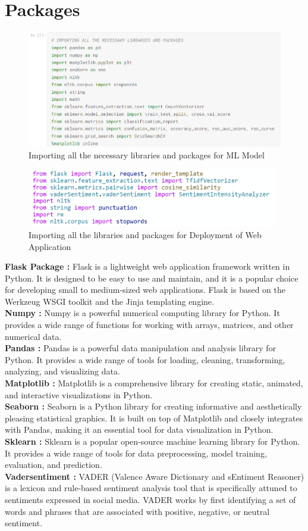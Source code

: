 \documentclass[a4paper, 12pt]{report}
\begin{document}
\section{Packages}
\begin{figure}[h]
	\includegraphics[height=2in,width=6in]{e}
	\caption{Importing all the necessary libraries and packages for ML Model}
	\label{Fig.}
\end{figure}
\begin{figure}[h]
	\includegraphics[height=1in,width=6in]{f}
	\caption{Importing all the libraries and packages for Deployment of Web Application}
	\label{Fig.}
\end{figure}

\textbf{Flask Package :} Flask is a lightweight web application framework written in Python. It is designed to be easy to use and maintain, and it is a popular choice for developing small to medium-sized web applications. Flask is based on the Werkzeug WSGI toolkit and the Jinja templating engine.\\
\textbf{Numpy :}
Numpy is a powerful numerical computing library for Python. It provides a wide range of functions for working with arrays, matrices, and other numerical data.\\
\textbf{Pandas : }Pandas is a powerful data manipulation and analysis library for Python. It provides a wide range of tools for loading, cleaning, transforming, analyzing, and visualizing data.\\
\textbf{Matplotlib :}
Matplotlib is a comprehensive library for creating static, animated, and interactive visualizations in Python.\\
\textbf{Seaborn :} Seaborn is a Python library for creating informative and aesthetically pleasing statistical graphics. It is built on top of Matplotlib and closely integrates with Pandas, making it an essential tool for data visualization in Python.\\
\textbf{Sklearn :}
Sklearn is a popular open-source machine learning library for Python. It provides a wide range of tools for data preprocessing, model training, evaluation, and prediction.\\
\textbf{Vadersentiment :}
VADER (Valence Aware Dictionary and sEntiment Reasoner) is a lexicon and rule-based sentiment analysis tool that is specifically attuned to sentiments expressed in social media.
VADER works by first identifying a set of words and phrases that are associated with positive, negative, or neutral sentiment. 
\end{document}
